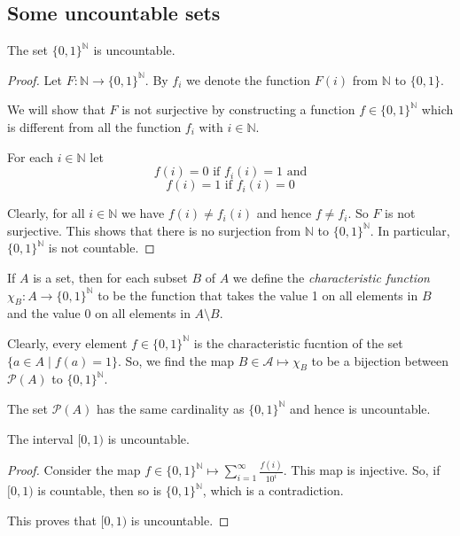 \subsection{Some uncountable sets}
\begin{proposition}
    The set $ \{0,1\}^\mathbb{N} $ is uncountable.
\end{proposition}
\begin{proof}[Proof]
    Let $ F: \mathbb{N} \to \{0,1\}^\mathbb{N} $. By $ f_i $ we denote the
    function $F(i)$ from $\mathbb{N}$ to $ \{0,1\} $.

    We will show that $F$ is not surjective by constructing a function
    $ f \in \{0,1\}^\mathbb{N} $ which is different from all the function
    $f_i$ with $i \in \mathbb{N}$.

    For each $ i \in \mathbb{N} $ let
    $$ f(i) = 0 \text{ if } f_i(i) = 1 \text{ and}$$
    $$ f(i) = 1 \text{ if } f_i(i) = 0 $$

    Clearly, for all $ i \in \mathbb{N} $ we have $ f(i) \ne f_i(i) $ and
    hence $ f \ne f_i $. So $F$ is not surjective. This shows that there is
    no surjection from $\mathbb{N}$ to $\{0,1\}^\mathbb{N}$. In particular,
    $ \{0,1\}^\mathbb{N} $ is not countable.
\end{proof}

\begin{remark}

\end{remark}

If $A$ is a set, then for each subset $B$ of $A$ we define the
\emph{characteristic function} $ \chi_B: A \to \{0,1\}^\mathbb{N} $ to be the
function that takes the value 1 on all elements in $B$ and the value 0 on all
elements in $A \setminus B$.

Clearly, every element $ f \in \{0,1\}^\mathbb{N} $ is the characteristic
fucntion of the set $ \{a \in A \mid f(a) = 1\} $. So, we find the map
$ B \in \mathscr{A} \mapsto \chi_B $ to be a bijection between
$ \mathscr{P}(A) $ to $ \{0,1\}^\mathbb{N} $.

\begin{corollary}
    The set $ \mathscr{P}(A) $ has the same cardinality as $ \{0,1\}^\mathbb{N} $
    and hence is uncountable.
\end{corollary}

\begin{proposition}
    The interval $ [0,1) $ is uncountable.
\end{proposition}
\begin{proof}[Proof]
    Consider the map $ f \in \{0,1\}^\mathbb{N} \mapsto
    \displaystyle\sum_{i=1}^{\infty}\frac{f(i)}{10^i} $. This map is injective.
    So, if $ [0,1) $ is countable, then so is $ \{0,1\}^\mathbb{N} $, which is
    a contradiction.

    This proves that $ [0,1) $ is uncountable.
\end{proof}

